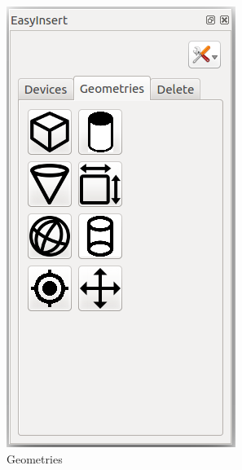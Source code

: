 \begin{figure}[h]
\begin{subfigure}[b]{0.32\textwidth}
                \centering
                \includegraphics[width=.95\linewidth]{Figures/EasyInsertGeo.png}
  				\caption{Geometries}
  				\label{fig:EasyInsertGeo}
        \end{subfigure}%
        \begin{subfigure}[b]{0.32\textwidth}
                \centering

\end{subfigure}
\end{figure}
